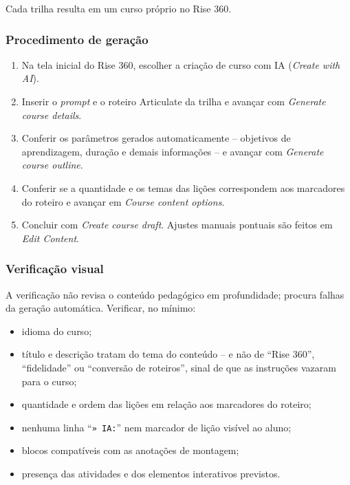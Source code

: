 \documentclass[12pt,a4paper]{article}
\begin{document}
Cada trilha resulta em um curso próprio no Rise 360.

\subsubsection*{Procedimento de geração}

\begin{enumerate}[leftmargin=*]
\item Na tela inicial do Rise 360, escolher a criação de curso com IA (\textit{Create with AI}).
\item Inserir o \textit{prompt} e o roteiro Articulate da trilha e avançar com \textit{Generate course details}.
\item Conferir os parâmetros gerados automaticamente -- objetivos de aprendizagem, duração e demais informações -- e avançar com \textit{Generate course outline}.
\item Conferir se a quantidade e os temas das lições correspondem aos marcadores do roteiro e avançar em \textit{Course content options}.
\item Concluir com \textit{Create course draft}. Ajustes manuais pontuais são feitos em \textit{Edit Content}.
\end{enumerate}

\subsubsection*{Verificação visual}

A verificação não revisa o conteúdo pedagógico em profundidade; procura falhas da geração automática. Verificar, no mínimo:

\begin{itemize}[leftmargin=*]
\item idioma do curso;
\item título e descrição tratam do tema do conteúdo -- e não de ``Rise 360'', ``fidelidade'' ou ``conversão de roteiros'', sinal de que as instruções vazaram para o curso;
\item quantidade e ordem das lições em relação aos marcadores do roteiro;
\item nenhuma linha ``\texttt{» IA:}'' nem marcador de lição visível ao aluno;
\item blocos compatíveis com as anotações de montagem;
\item presença das atividades e dos elementos interativos previstos.
\end{itemize}
\end{document}
